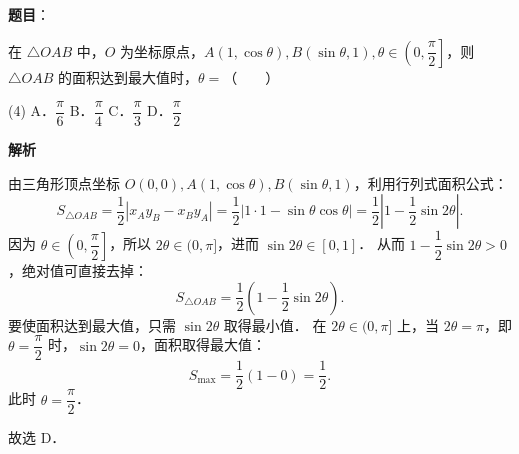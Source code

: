 \begin{answer}

\textbf{题目}：

在 $\triangle OAB$ 中，$O$ 为坐标原点，$A(1, \cos\theta), B(\sin\theta, 1), \theta \in \left(0, \dfrac{\pi}{2}\right]$，则 $\triangle OAB$ 的面积达到最大值时，$\theta =$\mbox{（　　）}

\begin{gkopts}(4)
\task A．$\dfrac{\pi}{6}$
\task B．$\dfrac{\pi}{4}$
\task C．$\dfrac{\pi}{3}$
\task D．$\dfrac{\pi}{2}$
\end{gkopts}

\textbf{解析}

由三角形顶点坐标 $O(0, 0), A(1, \cos\theta), B(\sin\theta, 1)$，利用行列式面积公式：
\nopagebreak[4]
\[
S_{\triangle OAB} = \dfrac{1}{2} |x_A y_B - x_B y_A| = \dfrac{1}{2} |1 \cdot 1 - \sin\theta \cos\theta| = \dfrac{1}{2} \left|1 - \dfrac{1}{2}\sin 2\theta\right|.
\]
因为 $\theta \in \left(0, \dfrac{\pi}{2}\right]$，所以 $2\theta \in (0, \pi]$，进而 $\sin 2\theta \in [0, 1]$．
从而 $1 - \dfrac{1}{2}\sin 2\theta > 0$，绝对值可直接去掉：
\nopagebreak[4]
\[
S_{\triangle OAB} = \dfrac{1}{2}\left(1 - \dfrac{1}{2}\sin 2\theta\right).
\]
要使面积达到最大值，只需 $\sin 2\theta$ 取得最小值．
在 $2\theta \in (0, \pi]$ 上，当 $2\theta = \pi$，即 $\theta = \dfrac{\pi}{2}$ 时，$\sin 2\theta = 0$，面积取得最大值：
\nopagebreak[4]
\[
S_{\max} = \dfrac{1}{2}(1 - 0) = \dfrac{1}{2}.
\]
此时 $\theta = \dfrac{\pi}{2}$．

故选 D．


\end{answer}
